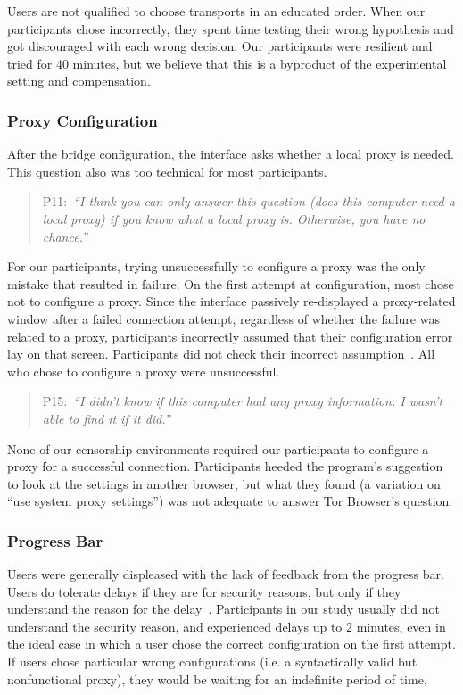 \documentclass[USenglish,oneside,twocolumn]{article}
\newcommand{\pquote}[2]{
\begin{quotation}
\noindent #1:~\textit{``#2''}
\end{quotation}
}
\begin{document}
Users are not qualified to choose transports in an educated order. When our participants chose incorrectly, they spent time testing their wrong hypothesis and got discouraged with each wrong decision. Our participants were resilient and tried for 40 minutes, but we believe that this is a byproduct of the experimental setting and compensation.

\subsubsection{Proxy Configuration} 
After the bridge configuration, the interface asks whether a local proxy is needed. This question also was too technical for most participants.

\pquote{P11}{I think you can only answer this question (does this computer need a local proxy) if you know what a local proxy is. Otherwise, you have no chance.}

For our participants, trying unsuccessfully to configure a proxy was the only mistake that resulted in failure. On the first attempt at configuration, most chose not to configure a proxy. Since the interface passively re-displayed a proxy-related window after a failed connection attempt, regardless of whether the failure was related to a proxy, participants incorrectly assumed that their configuration error lay on that screen. Participants did not check their incorrect assumption~\cite{wason1960failure}. All who chose to configure a proxy were unsuccessful. 

\pquote{P15}{I didn't know if this computer had any proxy information. I wasn't able to find it if it did.}

None of our censorship environments required our participants to configure a proxy for a successful connection. Participants heeded the program's suggestion to look at the settings in another browser, but what they found (a variation on ``use system proxy settings'') was not adequate to answer Tor Browser's question.

\subsubsection{Progress Bar} 
Users were generally displeased with the lack of feedback from the progress bar. Users do tolerate delays if they are for security reasons, but only if they understand the reason for the delay~\cite{egelmanplease}. Participants in our study usually did not understand the security reason, and experienced delays up to 2 minutes, even in the ideal case in which a user chose the correct configuration on the first attempt. If users chose particular wrong configurations (i.e. a syntactically valid but nonfunctional proxy), they would be waiting for an indefinite period of time. 
\end{document}
